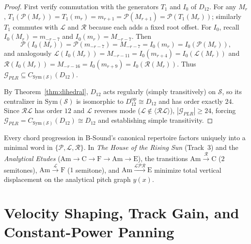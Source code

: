 \begin{proof}
First verify commutation with the generators $T_1$ and $I_0$ of $D_{12}$. For any $M_r$, $T_1(\mathcal{P}(M_r)) = T_1(m_r) = m_{r+1} = \mathcal{P}(M_{r+1}) = \mathcal{P}(T_1(M_r))$; similarly $T_1$ commutes with $\mathcal{L}$ and $\mathcal{R}$ because each adds a fixed root offset. For $I_0$, recall $I_0(M_r) = m_{-r-7}$ and $I_0(m_r) = M_{-r-7}$. Then
\[
\mathcal{P}(I_0(M_r)) = \mathcal{P}(m_{-r-7}) = M_{-r-7} = I_0(m_r) = I_0(\mathcal{P}(M_r)),
\]
and analogously $\mathcal{L}(I_0(M_r)) = M_{-r-11} = I_0(m_{r+4}) = I_0(\mathcal{L}(M_r))$ and $\mathcal{R}(I_0(M_r)) = M_{-r-16} = I_0(m_{r+9}) = I_0(\mathcal{R}(M_r))$. Thus $\mathcal{G}_{PLR} \subseteq C_{\mathrm{Sym}(\mathcal{S})}(D_{12})$.

By Theorem~\ref{thm:dihedral}, $D_{12}$ acts regularly (simply transitively) on $\mathcal{S}$, so its centralizer in $\mathrm{Sym}(\mathcal{S})$ is isomorphic to $D_{12}^{\mathrm{op}} \cong D_{12}$ and has order exactly $24$. Since $\mathcal{R}\mathcal{L}$ has order $12$ and $\mathcal{L}$ reverses mode ($\mathcal{L} \notin \langle \mathcal{R}\mathcal{L} \rangle$), $|\mathcal{G}_{PLR}| \ge 24$, forcing $\mathcal{G}_{PLR} = C_{\mathrm{Sym}(\mathcal{S})}(D_{12}) \cong D_{12}$ and establishing simple transitivity.
\end{proof}

\begin{corollary}
Every chord progression in B-Sound's canonical repertoire factors uniquely into a minimal word in $\{\mathcal{P}, \mathcal{L}, \mathcal{R}\}$. In \emph{The House of the Rising Sun} (Track~3) and the \emph{Analytical Etudes} ($\mathrm{Am} \to \mathrm{C} \to \mathrm{F} \to \mathrm{Am} \to \mathrm{E}$), the transitions $\mathrm{Am} \xrightarrow{\mathcal{R}} \mathrm{C}$ ($2$ semitones), $\mathrm{Am} \xrightarrow{\mathcal{L}} \mathrm{F}$ ($1$ semitone), and $\mathrm{Am} \xrightarrow{\mathcal{L}\mathcal{P}\mathcal{R}} \mathrm{E}$ minimize total vertical displacement on the analytical pitch graph $y(x)$.
\end{corollary}

\section{Velocity Shaping, Track Gain, and Constant-Power Panning}

